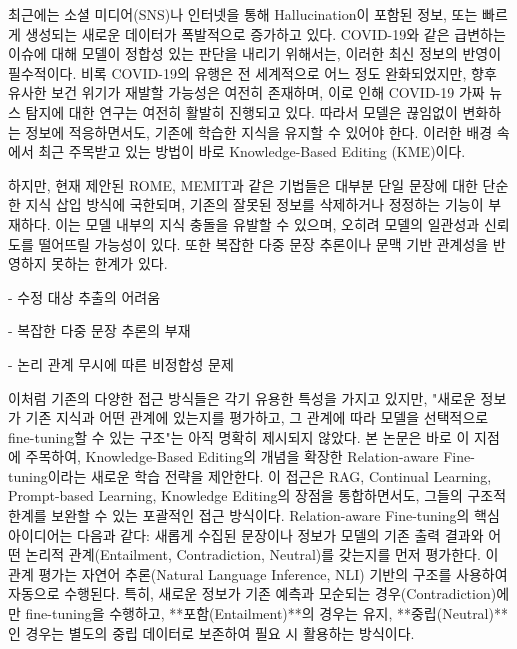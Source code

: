 \documentclass[a4paper,fleqn]{cas-sc}
\begin{document}
최근에는 소셜 미디어(SNS)나 인터넷을 통해 Hallucination이 포함된 정보, 또는 빠르게 생성되는 새로운 데이터가 폭발적으로 증가하고 있다. 
COVID-19와 같은 급변하는 이슈에 대해 모델이 정합성 있는 판단을 내리기 위해서는, 이러한 최신 정보의 반영이 필수적이다. 
비록 COVID-19의 유행은 전 세계적으로 어느 정도 완화되었지만, 향후 유사한 보건 위기가 재발할 가능성은 여전히 존재하며, 이로 인해 COVID-19 가짜 뉴스 탐지에 대한 연구는 여전히 활발히 진행되고 있다.
따라서 모델은 끊임없이 변화하는 정보에 적응하면서도, 기존에 학습한 지식을 유지할 수 있어야 한다. 
이러한 배경 속에서 최근 주목받고 있는 방법이 바로 Knowledge-Based Editing (KME)이다.


하지만, 현재 제안된 ROME, MEMIT과 같은 기법들은 대부분 단일 문장에 대한 단순한 지식 삽입 방식에 국한되며, 기존의 잘못된 정보를 삭제하거나 정정하는 기능이 부재하다. 
이는 모델 내부의 지식 충돌을 유발할 수 있으며, 오히려 모델의 일관성과 신뢰도를 떨어뜨릴 가능성이 있다. 또한 복잡한 다중 문장 추론이나 문맥 기반 관계성을 반영하지 못하는 한계가 있다.

- 수정 대상 추출의 어려움

- 복잡한 다중 문장 추론의 부재

- 논리 관계 무시에 따른 비정합성 문제

이처럼 기존의 다양한 접근 방식들은 각기 유용한 특성을 가지고 있지만, "새로운 정보가 기존 지식과 어떤 관계에 있는지를 평가하고, 그 관계에 따라 모델을 선택적으로 fine-tuning할 수 있는 구조"는 아직 명확히 제시되지 않았다.
본 논문은 바로 이 지점에 주목하여, Knowledge-Based Editing의 개념을 확장한 Relation-aware Fine-tuning이라는 새로운 학습 전략을 제안한다. 
이 접근은 RAG, Continual Learning, Prompt-based Learning, Knowledge Editing의 장점을 통합하면서도, 그들의 구조적 한계를 보완할 수 있는 포괄적인 접근 방식이다.
Relation-aware Fine-tuning의 핵심 아이디어는 다음과 같다:
새롭게 수집된 문장이나 정보가 모델의 기존 출력 결과와 어떤 논리적 관계(Entailment, Contradiction, Neutral)를 갖는지를 먼저 평가한다.
이 관계 평가는 자연어 추론(Natural Language Inference, NLI) 기반의 구조를 사용하여 자동으로 수행된다.
특히, 새로운 정보가 기존 예측과 모순되는 경우(Contradiction)에만 fine-tuning을 수행하고, **포함(Entailment)**의 경우는 유지, **중립(Neutral)**인 경우는 별도의 중립 데이터로 보존하여 필요 시 활용하는 방식이다.
\end{document}
